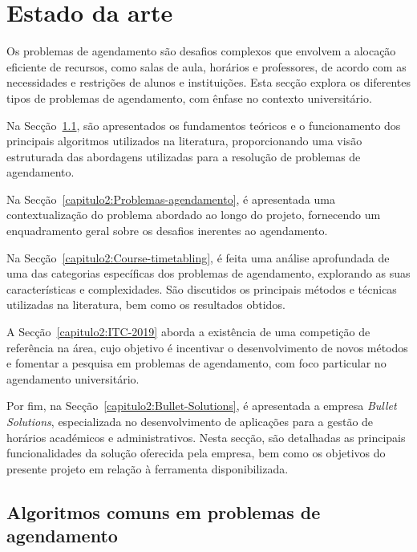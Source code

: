% 
%  
%
\chapter{Estado da arte}
\label{capitulo:estado-arte}

Os problemas de agendamento são desafios complexos que envolvem a alocação eficiente de recursos, como salas de aula, horários e professores, de acordo com as necessidades e restrições de alunos e instituições. Esta secção explora os diferentes tipos de problemas de agendamento, com ênfase no contexto universitário.

Na Secção~\ref{capitulo2:Teoria-funcionamento-algoritmos}, são apresentados os fundamentos teóricos e o funcionamento dos principais algoritmos utilizados na literatura, proporcionando uma visão estruturada das abordagens utilizadas para a resolução de problemas de agendamento.

Na Secção~\ref{capitulo2:Problemas-agendamento}, é apresentada uma contextualização do problema abordado ao longo do projeto, fornecendo um enquadramento geral sobre os desafios inerentes ao agendamento.

Na Secção~\ref{capitulo2:Course-timetabling}, é feita uma análise aprofundada de uma das categorias específicas dos problemas de agendamento, explorando as suas características e complexidades. São discutidos os principais métodos e técnicas utilizadas na literatura, bem como os resultados obtidos.

A Secção~\ref{capitulo2:ITC-2019} aborda a existência de uma competição de referência na área, cujo objetivo é incentivar o desenvolvimento de novos métodos e fomentar a pesquisa em problemas de agendamento, com foco particular no agendamento universitário.

Por fim, na Secção~\ref{capitulo2:Bullet-Solutions}, é apresentada a empresa \textit{Bullet Solutions}, especializada no desenvolvimento de aplicações para a gestão de horários académicos e administrativos. Nesta secção, são detalhadas as principais funcionalidades da solução oferecida pela empresa, bem como os objetivos do presente projeto em relação à ferramenta disponibilizada.

\section{Algoritmos comuns em problemas de agendamento}
\label{capitulo2:Teoria-funcionamento-algoritmos}


